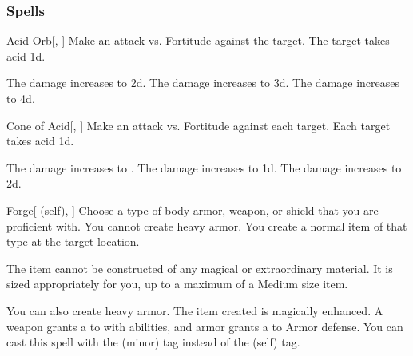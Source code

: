 \subsubsection{Spells}


\lowercase{\hypertarget{spell:Acid Orb}{}}\label{spell:Acid Orb}
\begin{freeability}[Rank 1]{\hypertarget{spell:Acid Orb}{Acid Orb}}[, ]
Make an attack vs. Fortitude against the target.
\hit The target takes acid  \plus1d.

\rankline
{} The damage increases to  \plus2d.
 The damage increases to  \plus3d.
 The damage increases to  \plus4d.

\end{freeability}
\vspace{0.25em}



\lowercase{\hypertarget{spell:Cone of Acid}{}}\label{spell:Cone of Acid}
\begin{freeability}[Rank 1]{\hypertarget{spell:Cone of Acid}{Cone of Acid}}[, ]
Make an attack vs. Fortitude against each target.
\hit Each target takes acid  \minus1d.

\rankline
{} The damage increases to .
 The damage increases to  \plus1d.
 The damage increases to  \plus2d.

\end{freeability}
\vspace{0.25em}



\lowercase{\hypertarget{spell:Forge}{}}\label{spell:Forge}
\begin{attuneability}[Rank 1]{\hypertarget{spell:Forge}{Forge}}[ (self), ]
Choose a type of body armor, weapon, or shield that you are proficient with.
You cannot create heavy armor.
You create a normal item of that type at the target location.

The item cannot be constructed of any magical or extraordinary material.
It is sized appropriately for you, up to a maximum of a Medium size item.

\rankline
{} You can also create heavy armor.
 The item created is magically enhanced.
A weapon grants a   to  with  abilities,
and armor grants a   to Armor defense.
 You can cast this spell with the  (minor) tag instead of the  (self) tag.

\end{attuneability}
\vspace{0.25em}



